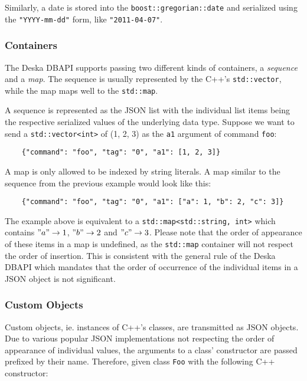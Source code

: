 \documentclass{article}
\begin{document}
Similarly, a date is stored into the {\tt boost::gregorian::date} and serialized using the {\tt "YYYY-mm-dd"} form, like
{\tt "2011-04-07"}.

\subsubsection{Containers}

The Deska DBAPI supports passing two different kinds of containers, a {\em sequence} and a {\em map}.  The sequence is
usually represented by the C++'s {\tt std::vector}, while the map maps well to the {\tt std::map}.

A sequence is represented as the JSON list with the individual list items being the respective serialized values of the
underlying data type. Suppose we want to send a {\tt std::vector<int>} of (1, 2, 3) as the {\tt a1} argument of command
{\tt foo}:

\begin{lstlisting}
    {"command": "foo", "tag": "0", "a1": [1, 2, 3]}
\end{lstlisting}

A map is only allowed to be indexed by string literals. A map similar to the sequence from the previous example would
look like this:

\begin{lstlisting}
    {"command": "foo", "tag": "0", "a1": ["a": 1, "b": 2, "c": 3]}
\end{lstlisting}

The example above is equivalent to a {\tt std::map<std::string, int>} which contains $"a" \rightarrow 1$, $"b"
\rightarrow 2$ and $"c" \rightarrow 3$.  Please note that the order of appearance of these items in a map is undefined,
as the {\tt std::map} container will not respect the order of insertion.  This is consistent with the general rule of
the Deska DBAPI which mandates that the order of occurrence of the individual items in a JSON object is not significant.

\subsubsection{Custom Objects}

Custom objects, ie. instances of C++'s classes, are transmitted as JSON objects. Due to various popular JSON
implementations not respecting the order of appearance of individual values, the arguments to a class' constructor are
passed prefixed by their name.  Therefore, given class {\tt Foo} with the following C++ constructor:
\end{document}
